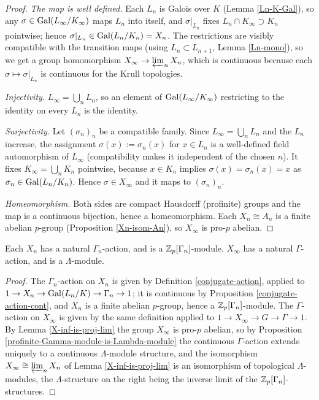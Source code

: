 \begin{proof}
\emph{The map is well defined.}
Each $L_n$ is Galois over $K$ (Lemma \ref{Ln-K-Gal}), so any
$\sigma\in{\mathrm{Gal}}(L_\infty/K_\infty)$ maps $L_n$ into itself, and
$\sigma|_{L_n}$ fixes $L_n\cap K_\infty\supset K_n$ pointwise; hence
$\sigma|_{L_n}\in{\mathrm{Gal}}(L_n/K_n)=X_n$.
The restrictions are visibly compatible with the transition maps
(using $L_n\subset L_{n+1}$, Lemma \ref{Ln-mono}), so we get a group
homomorphism $X_\infty\to\varprojlim_nX_n$, which is continuous because each
$\sigma\mapsto\sigma|_{L_n}$ is continuous for the Krull topologies.

\emph{Injectivity.}
$L_\infty=\bigcup_nL_n$, so an element of ${\mathrm{Gal}}(L_\infty/K_\infty)$ restricting
to the identity on every $L_n$ is the identity.

\emph{Surjectivity.}
Let $(\sigma_n)_n$ be a compatible family.
Since $L_\infty=\bigcup_nL_n$ and the $L_n$ increase, the assignment
$\sigma(x):=\sigma_n(x)$ for $x\in L_n$ is a well-defined field automorphism of
$L_\infty$ (compatibility makes it independent of the chosen $n$).
It fixes $K_\infty=\bigcup_nK_n$ pointwise, because $x\in K_n$ implies
$\sigma(x)=\sigma_n(x)=x$ as $\sigma_n\in{\mathrm{Gal}}(L_n/K_n)$.
Hence $\sigma\in X_\infty$ and it maps to $(\sigma_n)_n$.

\emph{Homeomorphism.}
Both sides are compact Hausdorff (profinite) groups and the map is a continuous
bijection, hence a homeomorphism.
Each $X_n\cong A_n$ is a finite abelian $p$-group
(Proposition \ref{Xn-isom-An}), so $X_\infty$ is pro-$p$ abelian.
\end{proof}

\begin{lem}
\label{X-has-Gamma-action}
Each $X_n$ has a natural $\Gamma_n$-action, and is a ${\mathbb {Z}}_p[\Gamma_n]$-module.
$X_\infty$ has a natural $\Gamma$-action, and is a $\Lambda$-module.
\end{lem}

\begin{proof}
The $\Gamma_n$-action on $X_n$ is given by
Definition \ref{conjugate-action}, applied to
$1\to X_n\to{\mathrm{Gal}}(L_n/K)\to\Gamma_n\to 1$; it is continuous by
Proposition \ref{conjugate-action-cont}, and $X_n$ is a finite abelian
$p$-group, hence a ${\mathbb {Z}}_p[\Gamma_n]$-module.
The $\Gamma$-action on $X_\infty$ is given by the same definition applied to
$1\to X_\infty\to G\to\Gamma\to 1$.
By Lemma \ref{X-inf-is-proj-lim} the group $X_\infty$ is pro-$p$ abelian, so by
Proposition \ref{profinite-Gamma-module-is-Lambda-module} the continuous
$\Gamma$-action extends uniquely to a continuous $\Lambda$-module structure,
and the isomorphism $X_\infty\cong\varprojlim_nX_n$ of
Lemma \ref{X-inf-is-proj-lim} is an isomorphism of topological
$\Lambda$-modules, the $\Lambda$-structure on the right being the inverse limit
of the ${\mathbb {Z}}_p[\Gamma_n]$-structures.
\end{proof}

